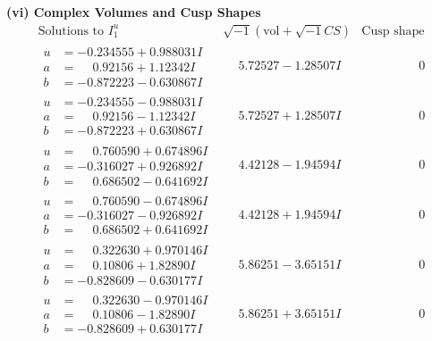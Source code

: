 \documentclass[1p]{elsarticle_modified}
\theoremstyle{definition}
\newcommand{\I}{\sqrt{-1}}
\begin{document}
\newpage\flushleft \textbf{(vi) Complex Volumes and Cusp Shapes}
$$\begin{array}{c|c|c}  
\text{Solutions to }I^u_{1}& \I (\text{vol} + \sqrt{-1}CS) & \text{Cusp shape}\\
 \hline 
\begin{aligned}
u &= -0.234555 + 0.988031 I \\
a &= \phantom{-}0.92156 + 1.12342 I \\
b &= -0.872223 - 0.630867 I\end{aligned}
 & \phantom{-}5.72527 - 1.28507 I & \phantom{-0.000000 } 0 \\ \hline\begin{aligned}
u &= -0.234555 - 0.988031 I \\
a &= \phantom{-}0.92156 - 1.12342 I \\
b &= -0.872223 + 0.630867 I\end{aligned}
 & \phantom{-}5.72527 + 1.28507 I & \phantom{-0.000000 } 0 \\ \hline\begin{aligned}
u &= \phantom{-}0.760590 + 0.674896 I \\
a &= -0.316027 + 0.926892 I \\
b &= \phantom{-}0.686502 - 0.641692 I\end{aligned}
 & \phantom{-}4.42128 - 1.94594 I & \phantom{-0.000000 } 0 \\ \hline\begin{aligned}
u &= \phantom{-}0.760590 - 0.674896 I \\
a &= -0.316027 - 0.926892 I \\
b &= \phantom{-}0.686502 + 0.641692 I\end{aligned}
 & \phantom{-}4.42128 + 1.94594 I & \phantom{-0.000000 } 0 \\ \hline\begin{aligned}
u &= \phantom{-}0.322630 + 0.970146 I \\
a &= \phantom{-}0.10806 + 1.82890 I \\
b &= -0.828609 - 0.630177 I\end{aligned}
 & \phantom{-}5.86251 - 3.65151 I & \phantom{-0.000000 } 0 \\ \hline\begin{aligned}
u &= \phantom{-}0.322630 - 0.970146 I \\
a &= \phantom{-}0.10806 - 1.82890 I \\
b &= -0.828609 + 0.630177 I\end{aligned}
 & \phantom{-}5.86251 + 3.65151 I & \phantom{-0.000000 } 0 \\ \hline\begin{aligned}

\end{aligned}
\end{array}$$
\end{document}
